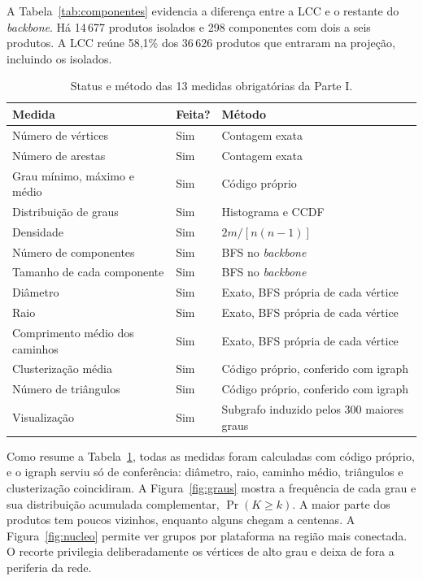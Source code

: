 \documentclass[sigconf,nonacm]{webmedia}
\begin{document}
A Tabela~\ref{tab:componentes} evidencia a diferença entre a LCC
e o restante do \emph{backbone}. Há 14\,677 produtos isolados e
298 componentes com dois a seis produtos. A LCC reúne 58,1\% dos
36\,626 produtos que entraram na projeção, incluindo os isolados.

\begin{table}[tbp]
\centering
\caption{Status e método das 13 medidas obrigatórias da Parte I.}
\label{tab:status}
\small
\setlength{\tabcolsep}{3.5pt}
\begin{tabular}{@{}p{}lp{}@{}}
\toprule
Medida & Feita? & Método \\
\midrule
Número de vértices & Sim & Contagem exata \\
Número de arestas & Sim & Contagem exata \\
Grau mínimo, máximo e médio & Sim & Código próprio \\
Distribuição de graus & Sim & Histograma e CCDF \\
Densidade & Sim & \(2m/[n(n-1)]\) \\
Número de componentes & Sim & BFS no \emph{backbone} \\
Tamanho de cada componente & Sim & BFS no \emph{backbone} \\
Diâmetro & Sim & Exato, BFS própria de cada vértice \\
Raio & Sim & Exato, BFS própria de cada vértice \\
Comprimento médio dos caminhos & Sim & Exato, BFS própria de cada vértice \\
Clusterização média & Sim & Código próprio, conferido com igraph \\
Número de triângulos & Sim & Código próprio, conferido com igraph \\
Visualização & Sim & Subgrafo induzido pelos 300 maiores graus \\
\bottomrule
\end{tabular}
\end{table}

Como resume a Tabela~\ref{tab:status}, todas as medidas foram
calculadas com código próprio, e o igraph serviu só de conferência:
diâmetro, raio, caminho médio, triângulos e clusterização coincidiram.
A
Figura~\ref{fig:graus} mostra a frequência de cada grau e sua
distribuição acumulada complementar, \(\Pr(K\geq k)\). A maior
parte dos produtos tem poucos vizinhos, enquanto alguns chegam a
centenas. A Figura~\ref{fig:nucleo} permite ver grupos por plataforma
na região mais conectada. O recorte privilegia deliberadamente os
vértices de alto grau e deixa de fora a periferia da rede.
\end{document}
